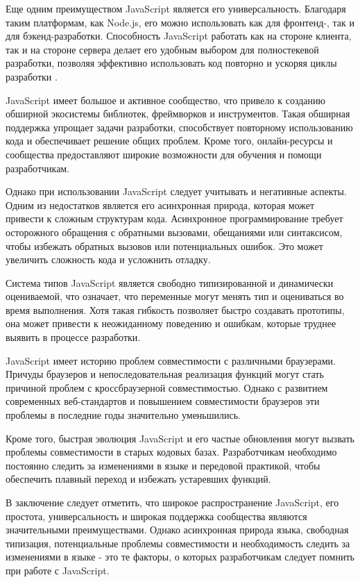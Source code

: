 Еще одним преимуществом JavaScript является его универсальность. Благодаря таким платформам, как Node.js, его можно использовать как для фронтенд-, так и для бэкенд-разработки. Способность JavaScript работать как на стороне клиента, так и на стороне сервера делает его удобным выбором для полностекевой разработки, позволяя эффективно использовать код повторно и ускоряя циклы разработки \cite{js3}.

JavaScript имеет большое и активное сообщество, что привело к созданию обширной экосистемы библиотек, фреймворков и инструментов. Такая обширная поддержка упрощает задачи разработки, способствует повторному использованию кода и обеспечивает решение общих проблем. Кроме того, онлайн-ресурсы и сообщества предоставляют широкие возможности для обучения и помощи разработчикам.

Однако при использовании JavaScript следует учитывать и негативные аспекты. Одним из недостатков является его асинхронная природа, которая может привести к сложным структурам кода. Асинхронное программирование требует осторожного обращения с обратными вызовами, обещаниями или синтаксисом, чтобы избежать обратных вызовов или потенциальных ошибок. Это может увеличить сложность кода и усложнить отладку.

Система типов JavaScript является свободно типизированной и динамически оцениваемой, что означает, что переменные могут менять тип и оцениваться во время выполнения. Хотя такая гибкость позволяет быстро создавать прототипы, она может привести к неожиданному поведению и ошибкам, которые труднее выявить в процессе разработки.

JavaScript имеет историю проблем совместимости с различными браузерами. Причуды браузеров и непоследовательная реализация функций могут стать причиной проблем с кроссбраузерной совместимостью. Однако с развитием современных веб-стандартов и повышением совместимости браузеров эти проблемы в последние годы значительно уменьшились.

Кроме того, быстрая эволюция JavaScript и его частые обновления могут вызвать проблемы совместимости в старых кодовых базах. Разработчикам необходимо постоянно следить за изменениями в языке и передовой практикой, чтобы обеспечить плавный переход и избежать устаревших функций.

В заключение следует отметить, что широкое распространение JavaScript, его простота, универсальность и широкая поддержка сообщества являются значительными преимуществами. Однако асинхронная природа языка, свободная типизация, потенциальные проблемы совместимости и необходимость следить за изменениями в языке - это те факторы, о которых разработчикам следует помнить при работе с JavaScript.

